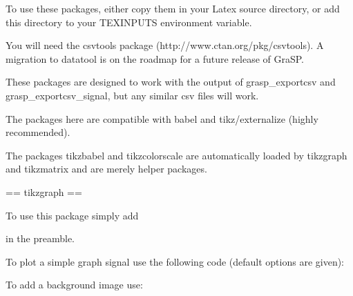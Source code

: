 To use these packages, either copy them in your Latex source directory, or add this directory to 
your TEXINPUTS environment variable.

You will need the csvtools package (http://www.ctan.org/pkg/csvtools). A migration to datatool is 
on the roadmap for a future release of GraSP.

These packages are designed to work with the output of grasp_exportcsv and grasp_exportcsv_signal, 
but any similar csv files will work.

The packages here are compatible with babel and tikz/externalize (highly recommended).

The packages tikzbabel and tikzcolorscale are automatically loaded by tikzgraph and tikzmatrix and 
are merely helper packages.

== tikzgraph ==

To use this package simply add
  \usepackage{tikzgraph}
in the preamble.

To plot a simple graph signal use the following code (default options are given):


To add a background image use:



